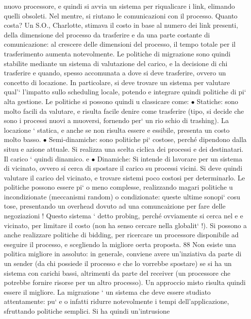 \documentclass[a4paper,12pt]{article}
\begin{document}
nuovo processore, e quindi si avvia un sistema per riqualicare i link, elimando
quelli obsoleti. Nel mentre, si riutano le comunicazioni con il processo.
Quanto costa? Un S.O., Charlotte, stimava il costo in base al numero dei
link presenti, della dimensione del processo da trasferire e da una parte costante
di comunicazione: al crescere delle dimensioni del processo, il tempo totale per
il trasferimento aumenta notevolmente.
Le politiche di migrazione sono quindi stabilite mediante un sistema di valutazione del carico, e la decisione di chi
trasferire e quando, spesso accomunata
a dove si deve trasferire, ovvero un concetto di locazione. In particolare, si deve
trovare un sistema per valutare qual'` l'impatto sullo scheduling locale, potendo
e
integrare quindi politiche di pi` alta gestione. Le politiche si possono quindi
u
classicare come:
$\bullet$ Statiche: sono molto facili da valutare, e risulta facile denire come trasferire
(tipo, si decide che sono i processi nuovi a muoversi, fornendo per` un rio
schio di trashing). La locazione ` statica, e anche se non risulta essere
e
essibile, presenta un costo molto basso.
$\bullet$ Semi-dinamiche: sono politiche pi` costose, perché dipendono dalla situu
e
azione attuale. Si realizza una scelta ciclica dei processi e dei destinatari.
Il carico ` quindi dinamico.
e
$\bullet$ Dinamiche: Si intende di lavorare per un sistema di vicinato, ovvero si
cerca di spostare il carico su processi vicini. Si deve quindi valutare il
carico del vicinato, e trovare sistemi poco costosi per determinarlo.
Le politiche possono essere pi` o meno complesse, realizzando magari politiche
u
incondizionate (meccanismi random) o condizionate: queste ultime sonopi` cosu
tose, presentando un overhead dovuto ad una comuncaizione per fare delle negoziazioni ! Questo sistema ` detto probing,
perché ovviamente si cerca nel
e
e
vicinato, per limitare il costo (non ha senso cercare nella globalit` !). Si possono
a
anche realizzare politiche di bidding, per ricercare un processore disponibile ad
eseguire il processo, e scegliendo la migliore oerta proposta.
88
\newpage
Non esiste una politica migliore in assoluto: in generale, conviene avere
un'inziativa da parte di un sender (da chi possiede il processo e che lo vorrebbe
spostare) se si ha un sistema con carichi bassi, altrimenti da parte del receiver
(un processore che potrebbe fornire risorse per un altro processo). Un approccio
misto risulta quindi essere il migliore.
La migrazione ` un sistema che deve essere studiato attentamente: pu`
e
o
infatti ridurre notevolmente i tempi dell'applicazione, sfruttando politiche semplici. Si ha quindi un'intrusione
\end{document}

